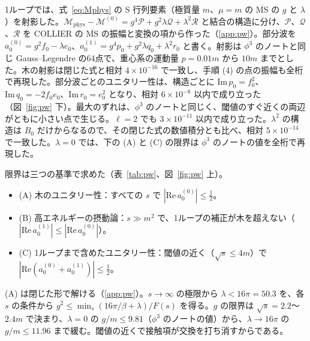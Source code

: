 \documentclass[a4paper,10pt]{ltjsarticle}
\begin{document}
1ループでは、式~\eqref{eq:Mphys} の S 行列要素（極質量 $m$、$\mu=m$ の $\overline{\mathrm{MS}}$ の $g$ と $\lambda$）を射影した。$\mathcal{M}_{\mathrm{phys}}-\mathcal{M}^{(0)}=g^4\mathcal{P}+g^2\lambda \mathcal{Q}+\lambda^2\mathcal{R}$ と結合の構造に分け、$\mathcal{P}$、$\mathcal{Q}$、$\mathcal{R}$ を COLLIER の $\overline{\mathrm{MS}}$ の振幅と変換の項から作った（\ref{app:pw}）。部分波を $a_0^{(0)}=g^2f_0-\lambda e_0$、$a_0^{(1)}=g^4p_0+g^2\lambda q_0+\lambda^2r_0$ と書く。射影は $\phi^3$ のノートと同じ Gauss--Legendre の64点で、重心系の運動量 $p=0.01m$ から $10m$ までとした。木の射影は閉じた式と相対 $4\times10^{-16}$ で一致し、手順 (4) の点の振幅も全桁で再現した。部分波ごとのユニタリー性は、構造ごとに $\mathrm{Im}\,p_0=f_0^2$、$\mathrm{Im}\,q_0=-2f_0e_0$、$\mathrm{Im}\,r_0=e_0^2$ となり、相対 $6\times10^{-8}$ 以内で成り立った（図~\ref{fig:pw} 下）。最大のずれは、$\phi^3$ のノートと同じく、閾値のすぐ近くの両辺がともに小さい点で生じる。$\ell=2$ でも $3\times10^{-11}$ 以内で成り立った。$\lambda^2$ の構造は $B_0$ だけからなるので、その閉じた式の数値積分とも比べ、相対 $5\times10^{-14}$ で一致した。$\lambda=0$ では、下の (A) と (C) の限界は $\phi^3$ のノートの値を全桁で再現した。

限界は三つの基準で求めた（表~\ref{tab:pw}、図~\ref{fig:pw} 上）。
\begin{itemize}
\item (A) 木のユニタリー性：すべての $s$ で $|\mathrm{Re}\,a_0^{(0)}|\le\frac12$。
\item (B) 高エネルギーの摂動論：$s\gg m^2$ で、1ループの補正が木を超えない（$|\mathrm{Re}\,a_0^{(1)}|\le|\mathrm{Re}\,a_0^{(0)}|$）。
\item (C) 1ループまで含めたユニタリー性：閾値の近く（$\sqrt s\le4m$）で $|\mathrm{Re}(a_0^{(0)}+a_0^{(1)})|\le\frac12$。
\end{itemize}

(A) は閉じた形で解ける（\ref{app:pw}）。$s\to\infty$ の極限から $\lambda<16\pi=50.3$ を、各 $s$ の条件から $g^2\le\min_s(16\pi/\beta+\lambda)/F(s)$ を得る。$g$ の限界は $\sqrt s=2.2$〜$2.4m$ で決まり、$\lambda=0$ の $g/m\le9.81$（$\phi^3$ のノートの値）から、$\lambda\to16\pi$ の $g/m\le11.96$ まで緩む。閾値の近くで接触項が交換を打ち消すからである。
\end{document}
